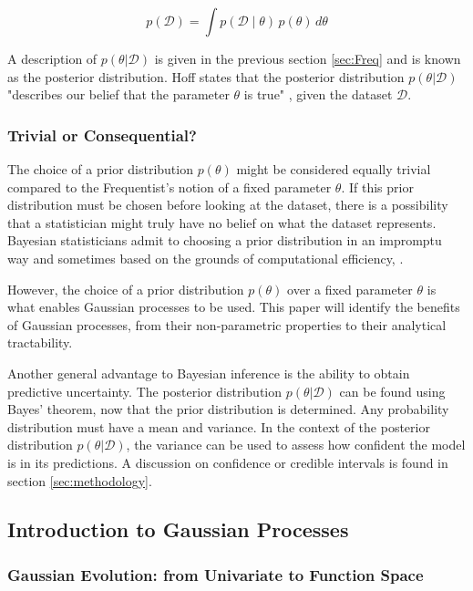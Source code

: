 \documentclass[12pt,a4paper]{article}
\begin{document}
\begin{equation}
p(\mathcal{D}) = \int p(\mathcal{D} \mid \theta) \, p(\theta) \, d\theta
\label{eq:Marginal Likelihood}
\end{equation}

A description of \(p(\theta|\mathcal{D})\) is given in the previous section \ref{sec:Freq} and is known as the posterior distribution. Hoff states that the posterior distribution \(p(\theta|\mathcal{D})\) "describes our belief that the parameter \(\theta\) is true" \citep[pp.~2]{hoff2009first}, given the dataset \(\mathcal{D}\). 

\subsubsection{Trivial or Consequential?}
\label{sec:Trivial or Consequential?}
The choice of a prior distribution \(p(\theta)\) might be considered equally trivial compared to the Frequentist's notion of a fixed parameter \(\theta\). If this prior distribution must be chosen before looking at the dataset, there is a possibility that a statistician might truly have no belief on what the dataset represents. Bayesian statisticians admit to choosing a prior distribution in an impromptu way and sometimes based on the grounds of computational efficiency, \citep{hoff2009first}.

However, the choice of a prior distribution \(p(\theta)\) over a fixed parameter \(\theta\) is what enables Gaussian processes to be used. This paper will identify the benefits of Gaussian processes, from their non-parametric properties to their analytical tractability.

Another general advantage to Bayesian inference is the ability to obtain predictive uncertainty. The posterior distribution \(p(\theta|\mathcal{D})\) can be found using Bayes' theorem, now that the prior distribution is determined. Any probability distribution must have a mean and variance. In the context of the posterior distribution \(p(\theta|\mathcal{D})\), the variance can be used to assess how confident the model is in its predictions. A discussion on confidence or credible intervals is found in section \ref{sec:methodology}. 

\subsection{Introduction to Gaussian Processes}

\subsubsection{Gaussian Evolution: from Univariate to Function Space}
\end{document}
